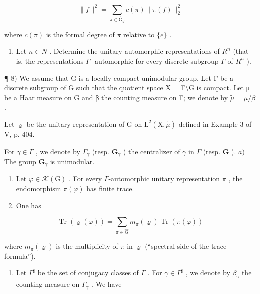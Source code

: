 \[
\| f \| ^ {2} = \sum_ {\pi \in \widehat {\mathrm{G}} _ {d}} c (\pi) \| \pi (f) \| _ {2} ^ {2}
\]

where \(c(\pi)\) is the formal degree of \(\pi\) relative to \(\{e\}\) .

\begin{enumerate}
\def\labelenumi{\arabic{enumi})}
\setcounter{enumi}{6}
\tightlist
\item
  Let \(n \in N\) . Determine the unitary automorphic representations of \(R^{n}\) (that is, the representations \(\Gamma\) -automorphic for every discrete subgroup \(\Gamma\) of \(R^{n}\) ).
\end{enumerate}

¶ 8) We assume that G is a locally compact unimodular group. Let Γ be a discrete subgroup of G such that the quotient space X = Γ\textbackslash G is compact. Let μ be a Haar measure on G and β the counting measure on Γ; we denote by \(\widetilde{\mu} = \mu/\beta\) .

Let \(\varrho\) be the unitary representation of G on \(\mathrm{L}^{2}(\mathrm{X},\widetilde{\mu})\) defined in Example 3 of V, p. 404.

For \(\gamma\in\Gamma\) , we denote by \(\Gamma_{\gamma}\) (resp. \(\mathbf{G}_{\gamma}\) ) the centralizer of \(\gamma\) in \(\Gamma\) (resp. \(\mathbf{G}\) ). \(a)\) The group \(\mathbf{G}_{\gamma}\) is unimodular.

\begin{enumerate}
\def\labelenumi{\alph{enumi})}
\setcounter{enumi}{1}
\item
  Let \(\varphi\in\mathcal{K}(\mathrm{G})\) . For every \(\Gamma\)-automorphic unitary representation \(\pi\) , the endomorphism \(\pi(\varphi)\) has finite trace.
\item
  One has
\end{enumerate}

\[
\operatorname{Tr} (\varrho (\varphi)) = \sum_ {\pi \in \widehat {\mathrm{G}}} m _ {\pi} (\varrho) \operatorname{Tr} (\pi (\varphi))
\]

where \(m_{\pi}(\varrho)\) is the multiplicity of \(\pi\) in \(\varrho\) (“spectral side of the trace formula”).

\begin{enumerate}
\def\labelenumi{\alph{enumi})}
\setcounter{enumi}{3}
\tightlist
\item
  Let \(\Gamma^{\sharp}\) be the set of conjugacy classes of \(\Gamma\) . For \(\gamma \in \Gamma^{\sharp}\) , we denote by \(\beta_{\gamma}\) the counting measure on \(\Gamma_{\gamma}\) . We have
\end{enumerate}

